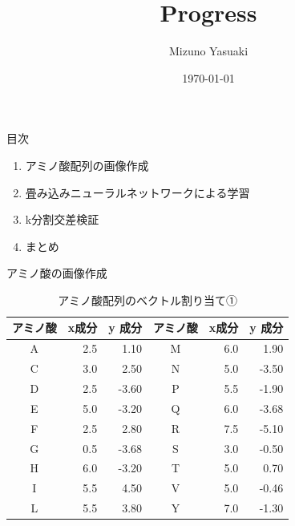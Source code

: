 \documentclass[dvipdfmx]{beamer}
\title{Progress}
\date{\today}
\author{Mizuno Yasuaki}
\begin{document}
  \maketitle

  \begin{frame}{目次}
    \begin{enumerate}
      \item アミノ酸配列の画像作成
      \item 畳み込みニューラルネットワークによる学習
      \item k分割交差検証
      \item まとめ
    \end{enumerate}
  \end{frame}

  \begin{frame}{アミノ酸の画像作成}
    \begin{table}[H]
      \centering
      \caption{アミノ酸配列のベクトル割り当て①}
      \label{tab:amino_vector}
      \begin{tabular}{crrcrr}
        \toprule 
        アミノ酸 & x成分 & y 成分 & アミノ酸 & x成分 & y 成分 \\
        \midrule
        A & 2.5 & 1.10 & M & 6.0 & 1.90 \\
        C & 3.0 & 2.50 & N & 5.0 & -3.50 \\
        D & 2.5 & -3.60 & P & 5.5 & -1.90 \\ 
        E & 5.0 & -3.20 & Q & 6.0 & -3.68 \\
        F & 2.5 & 2.80 & R & 7.5 & -5.10 \\
        G & 0.5 & -3.68 & S & 3.0 & -0.50 \\
        H & 6.0 & -3.20 & T & 5.0 & 0.70 \\
        I & 5.5 & 4.50 & V & 5.0 & -0.46 \\
        L & 5.5 & 3.80 & Y & 7.0 & -1.30 \\
        \bottomrule
      \end{tabular}
    \end{table}
  \end{frame}
\end{document}
